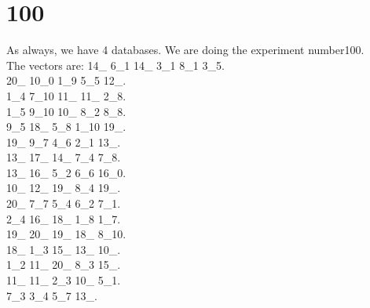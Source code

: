 \chapter{100}
\indent As always, we have 4 databases. We are doing the experiment number100.\\
The vectors are:
14\_ 6\_1 14\_ 3\_1 8\_1 3\_5.\\20\_ 10\_0 1\_9 5\_5 12\_.\\1\_4 7\_10 11\_ 11\_ 2\_8.\\1\_5 9\_10 10\_ 8\_2 8\_8.\\9\_5 18\_ 5\_8 1\_10 19\_.\\19\_ 9\_7 4\_6 2\_1 13\_.\\13\_ 17\_ 14\_ 7\_4 7\_8.\\13\_ 16\_ 5\_2 6\_6 16\_0.\\10\_ 12\_ 19\_ 8\_4 19\_.\\20\_ 7\_7 5\_4 6\_2 7\_1.\\2\_4 16\_ 18\_ 1\_8 1\_7.\\19\_ 20\_ 19\_ 18\_ 8\_10.\\18\_ 1\_3 15\_ 13\_ 10\_.\\1\_2 11\_ 20\_ 8\_3 15\_.\\11\_ 11\_ 2\_3 10\_ 5\_1.\\7\_3 3\_4 5\_7 13\_.\\